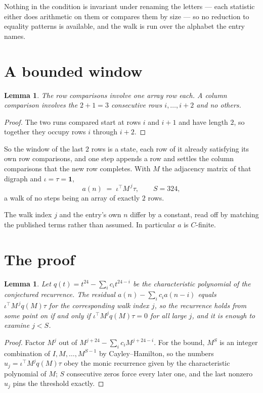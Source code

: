 \documentclass[11pt,a4paper]{article}
\theoremstyle{plain}
\newtheorem{lemma}[theorem]{Lemma}
\theoremstyle{definition}
\begin{document}
Nothing in the condition is invariant under renaming the letters --- each statistic either does
arithmetic on them or compares them by size --- so no reduction to equality patterns is
available, and the walk is run over the alphabet the entry names.

\section{A bounded window}

\begin{lemma}\label{lem:win}
The row comparisons involve one array row each. A column comparison involves the
$2+1=3$ consecutive rows $i,\dots,i{+}2$ and no others.
\end{lemma}

\begin{proof}
The two runs compared start at rows $i$ and $i+1$ and have length $2$, so together they
occupy rows $i$ through $i+2$.
\end{proof}

So the window of the last $2$ rows is a state, each row of it already satisfying its own row
comparisons, and one step appends a row and settles the column comparisons that the new row
completes. With $M$ the adjacency matrix of that digraph and $\iota=\tau=\mathbf{1}$,
\[
a(n)\;=\;\iota^{\!\top}M^{\,j}\tau ,\qquad S=324,
\]
a walk of no steps being an array of exactly $2$ rows.

The walk index $j$ and the entry's own $n$ differ by a constant, read off by matching the
published terms rather than assumed. In particular $a$ is $C$-finite.

\section{The proof}

\begin{lemma}\label{lem:crit}
Let $q(t)=t^{24}-\sum_i c_it^{24-i}$ be the characteristic polynomial of the
conjectured recurrence. The residual $a(n)-\sum_ic_ia(n-i)$ equals
$\iota^{\!\top}M^{\,j}q(M)\tau$ for the corresponding walk index $j$, so the recurrence
holds from some point on if and only if $\iota^{\!\top}M^{j}q(M)\tau=0$ for all large $j$,
and it is enough to examine $j<S$.
\end{lemma}

\begin{proof}
Factor $M^{j}$ out of $M^{j+24}-\sum_ic_iM^{j+24-i}$. For the bound, $M^{S}$
is an integer combination of $I,M,\dots,M^{S-1}$ by Cayley--Hamilton, so the numbers
$u_j=\iota^{\!\top}M^{j}q(M)\tau$ obey the monic recurrence given by the characteristic
polynomial of $M$; $S$ consecutive zeros force every later one, and the last nonzero $u_j$
pins the threshold exactly.
\end{proof}
\end{document}
